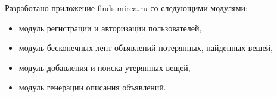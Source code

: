 \label{sec:conclusion}

Разработано приложение finds.mirea.ru со следующими модулями:
\begin{itemize}
	\item модуль регистрации и авторизации пользователей,
	\item модуль бесконечных лент объявлений потерянных, найденных вещей,
	\item модуль добавления и поиска утерянных вещей,
	\item модуль генерации описания объявлений.
\end{itemize}